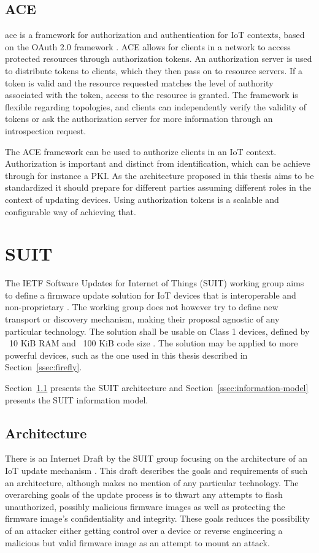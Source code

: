 \documentclass[0-thesis.tex]{subfiles}
\begin{document}
\subsection{ACE}
\label{ssec:ace}
\gls{ace} is a framework for authorization and authentication for IoT contexts, based on
the OAuth 2.0 framework \parencite{ace}. ACE allows for clients in a network to access
protected resources through authorization tokens. An authorization server is used to
distribute tokens to clients, which they then pass on to resource servers. If a token is
valid and the resource requested matches the level of authority associated with the token,
access to the resource is granted. The framework is flexible regarding topologies, and
clients can independently verify the validity of tokens or ask the authorization server
for more information through an introspection request.

The ACE framework can be used to authorize clients in an IoT context. Authorization is
important and distinct from identification, which can be achieve through for instance a
PKI. As the architecture proposed in this thesis aims to be standardized it should prepare
for different parties assuming different roles in the context of updating devices. Using
authorization tokens is a scalable and configurable way of achieving that.

\section{SUIT}
\label{sec:suit}
The IETF Software Updates for Internet of Things (SUIT) working group aims to define a
firmware update solution for IoT devices that is interoperable and non-proprietary
\parencite{suit}. The working group does not however try to define new transport or
discovery mechanism, making their proposal agnostic of any particular technology. The
solution shall be usable on Class 1 devices, defined by ~10 KiB RAM and ~100 KiB code size
\parencite{rfc7228}. The solution may be applied to more powerful devices, such as the one
used in this thesis described in Section~\ref{ssec:firefly}.

Section~\ref{ssec:architecture} presents the SUIT architecture and
Section~\ref{ssec:information-model} presents the SUIT information model.

\subsection{Architecture}
\label{ssec:architecture}
There is an Internet Draft by the SUIT group focusing on the architecture of an IoT update
mechanism \parencite{suit-architecture}. This draft describes the goals and requirements
of such an architecture, although makes no mention of any particular technology. The
overarching goals of the update process is to thwart any attempts to flash unauthorized,
possibly malicious firmware images as well as protecting the firmware image's
confidentiality and integrity. These goals reduces the possibility of an attacker either
getting control over a device or reverse engineering a malicious but valid firmware image
as an attempt to mount an attack.
\end{document}

